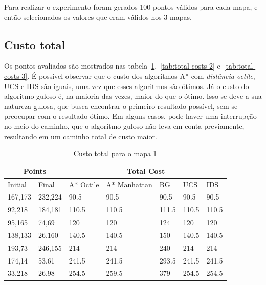 Para realizar o experimento foram gerados 100 pontos válidos para cada mapa, e então selecionados os valores que eram válidos nos 3 mapas.

\subsection{Custo total}
Os pontos avaliados são mostrados nas tabela~\ref{tab:total-costs-1},~\ref{tab:total-costs-2} e~\ref{tab:total-costs-3}. É possível observar que o custo dos algoritmos A* com \textit{distância octile}, UCS e IDS são iguais, uma vez que esses algoritmos são ótimos. Já o custo do algoritmo guloso é, na maioria das vezes, maior do que o ótimo. Isso se deve a sua natureza gulosa, que busca encontrar o primeiro resultado possível, sem se preocupar com o resultado ótimo. Em alguns casos, pode haver uma interrupção no meio do caminho, que o algoritmo guloso não leva em conta previamente, resultando em um caminho total de custo maior.

\begin{table}[htbp]
\centering
\caption{Custo total para o mapa 1}
\label{tab:total-costs-1}
\begin{tabular}{ll|lllll}
\multicolumn{2}{c|}{Points}  & \multicolumn{5}{c}{Total Cost} \\ \hline
Initial & Final & A* Octile & A* Manhattan & BG    & UCS   & IDS   \\ \hline
167,173       & 232,224     & 90.5      & 90.5         & 90.5  & 90.5  & 90.5  \\
92,218        & 184,181     & 110.5     & 110.5        & 111.5 & 110.5 & 110.5 \\
95,165        & 74,69       & 120       & 120          & 124   & 120   & 120   \\
138,133       & 26,160      & 140.5     & 140.5        & 150   & 140.5 & 140.5 \\
193,73        & 246,155     & 214       & 214          & 240   & 214   & 214   \\
174,14        & 53,61       & 241.5     & 241.5        & 293.5 & 241.5 & 241.5 \\
33,218        & 26,98       & 254.5     & 259.5        & 379   & 254.5 & 254.5
\end{tabular}
\end{table}

